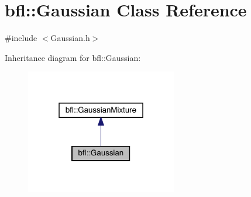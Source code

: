 \hypertarget{classbfl_1_1Gaussian}{}\section{bfl\+:\+:Gaussian Class Reference}
\label{classbfl_1_1Gaussian}


{\ttfamily \#include $<$Gaussian.\+h$>$}



Inheritance diagram for bfl\+:\+:Gaussian\+:
\nopagebreak
\begin{figure}[H]
\begin{center}
\leavevmode
\includegraphics[width=187pt]{classbfl_1_1Gaussian__inherit__graph}
\end{center}
\end{figure}
